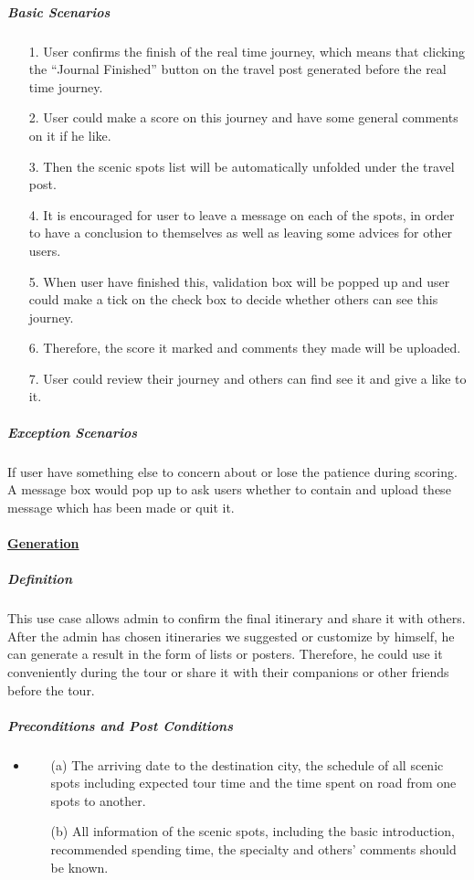 \documentclass[10pt]{article}
\begin{document}
\begin{itemize}
		\subparagraph{Basic Scenarios}
		\begin{itemize}
			\item[1.] User confirms the finish of the real time journey, which means that clicking the “Journal Finished” button on the travel post generated before the real time journey.
			\item[2.]User could make a score on this journey and have some general comments on it if he like.
			\item[3.]Then the scenic spots list will be automatically unfolded under the travel post.
			\item[4.]It is encouraged for user to leave a message on each of the spots, in order to have a conclusion to themselves as well as leaving some advices for other users.
			\item[5.]When user have finished this, validation box will be popped up and user could make a tick on the check box to decide whether others can see this journey.
			\item[6.]Therefore, the score it marked and comments they made will be uploaded.
			\item[7.]User could review their journey and others can find see it and give a like to it.
			
		 \end{itemize}
		 
		 \subparagraph{Exception Scenarios}
		 If user have something else to concern about or lose the patience during scoring. A message box would pop up to ask users whether to contain and upload these message which has been made or quit it.

		 \paragraph{\underline{Generation}}
		 \subparagraph{Definition}
		 This use case allows admin to confirm the final itinerary and share it with others. After the admin has chosen itineraries we suggested or customize by himself, he can generate a result in the form of lists or posters. Therefore, he could use it conveniently during the tour or share it with their companions or other friends before the tour.

		 \subparagraph{Preconditions and Post Conditions}
		 \begin{itemize}
			 \item \begin{itemize}
				 \item[(a)] The arriving date to the destination city, the schedule of all scenic spots including expected tour time and the time spent on road from one spots to another.
				 \item[(b)] All information of the scenic spots, including the basic introduction, recommended spending time, the specialty and others’ comments should be known. 
			 \end{itemize}


\end{itemize}
\end{itemize}
\end{document}
